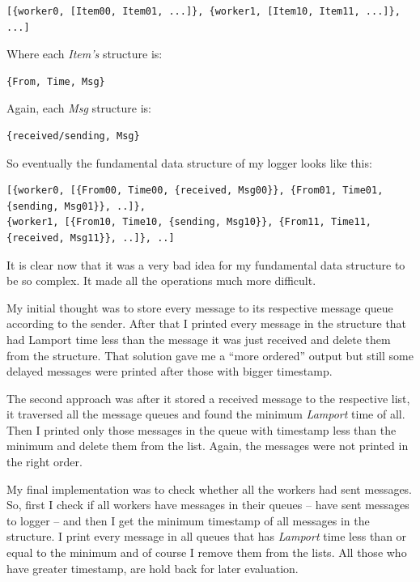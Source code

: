 \documentclass[a4paper, 11pt]{article}
\begin{document}
\begin{verbatim}
[{worker0, [Item00, Item01, ...]}, {worker1, [Item10, Item11, ...]}, ...]
\end{verbatim}

Where each \emph{Item's} structure is:

\begin{verbatim}
{From, Time, Msg}
\end{verbatim}

Again, each \emph{Msg} structure is:

\begin{verbatim}
{received/sending, Msg}
\end{verbatim}

So eventually the fundamental data structure of my logger looks like this:

\footnotesize
\begin{verbatim}
[{worker0, [{From00, Time00, {received, Msg00}}, {From01, Time01, {sending, Msg01}}, ..]},
{worker1, [{From10, Time10, {sending, Msg10}}, {From11, Time11, {received, Msg11}}, ..]}, ..]
\end{verbatim}
\normalsize

It is clear now that it was a very bad idea for my fundamental data structure to be so
complex. It made all the operations much more difficult.

My initial thought was to store every message to its respective message queue
according to the sender. After that I printed every message in the structure
that had Lamport time less than the message it was just received and delete them
from the structure. That solution gave me a ``more ordered'' output but still
some delayed messages were printed after those with bigger timestamp.

The second approach was after it stored a received message to the respective list,
it traversed all the message queues and found the minimum \emph{Lamport} time
of all. Then I printed only those messages in the queue with timestamp less than
the minimum and delete them from the list. Again, the messages were not printed
in the right order.

My final implementation was to check whether all the workers had sent messages.
So, first I check if all workers have messages in their queues -- have sent
messages to logger -- and then I get the minimum timestamp of all messages in
the structure. I print every message in all queues that has \emph{Lamport} time
less than or equal to the minimum and of course I remove them from the lists.
All those who have greater timestamp, are hold back for later evaluation.
\end{document}
